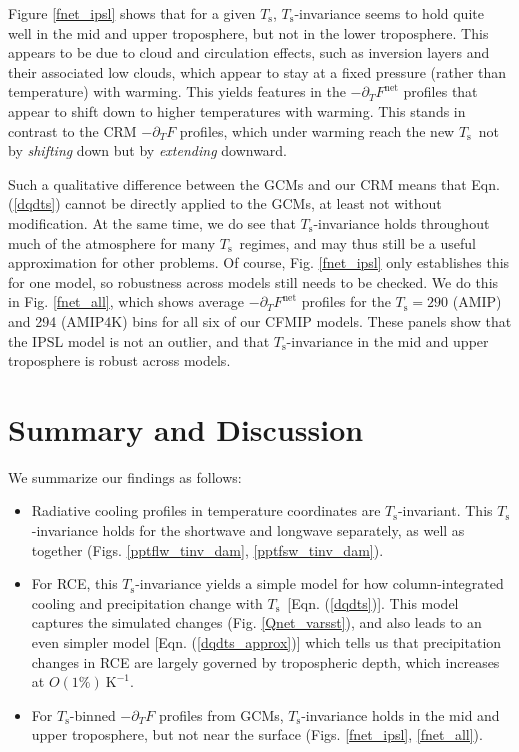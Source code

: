 \documentclass[9pt,twocolumn,twoside,lineno]{pnas-new}
\newcommand{\eqnref}[1]{(\ref{#1})}
\newcommand{\ppt}{\ensuremath{\partial_T}}
\newcommand{\Fnet}{\ensuremath{F^\mathrm{net}}}
\newcommand{\Ts}{\ensuremath{T_\mathrm{s}}}
\newcommand{\Kinverse}{\ensuremath{\mathrm{K^{-1}}}}
\begin{document}
 Figure \ref{fnet_ipsl} shows that for a given \Ts, \Ts-invariance seems to hold quite well in the mid and upper troposphere, but not in the lower troposphere. This appears to be due to cloud and circulation  effects, such as inversion layers and their associated low clouds, which appear to stay at a fixed pressure (rather than temperature) with warming. This yields features in the $-\ppt \Fnet$ profiles that appear to shift down to higher temperatures with  warming. This stands in contrast to the CRM $-\ppt F$ profiles, which under warming reach the new \Ts\ not by \emph{shifting} down but by \emph{extending} downward. 

Such a qualitative difference between the GCMs and our CRM means that Eqn. \eqnref{dqdts} cannot be directly applied to the GCMs, at least not without modification. At the same time, we do see that \Ts-invariance holds throughout much of the atmosphere for many \Ts\ regimes, and may thus still be a useful approximation for other problems. Of course, Fig. \ref{fnet_ipsl} only establishes this for one model, so robustness across models still needs to be checked. We do this in Fig. \ref{fnet_all}, which shows average $-\ppt \Fnet$ profiles for the $\Ts= 290$ (AMIP) and 294 (AMIP4K) bins  for all six of our  CFMIP models. These panels show that the IPSL model is not an outlier, and that \Ts-invariance in the mid and upper troposphere is robust across models.



\section{Summary and Discussion}
We summarize our findings as follows:
	\begin{itemize}
		\item Radiative cooling profiles in temperature coordinates are  \Ts-invariant. This \Ts-invariance holds for the shortwave and longwave separately, as well as together (Figs. \ref{pptflw_tinv_dam}, \ref{pptfsw_tinv_dam}).
		\item For RCE, this \Ts-invariance yields a simple model for how column-integrated cooling and  precipitation change with \Ts\ [Eqn. \eqnref{dqdts}]. This model captures the simulated changes (Fig. \ref{Qnet_varsst}), and also leads to an even simpler model [Eqn. \eqnref{dqdts_approx}] which tells us that precipitation changes in RCE are largely governed by tropospheric depth, which increases at $O(1\%)\ \Kinverse$.
		\item For \Ts-binned $-\ppt F$ profiles from GCMs, \Ts-invariance holds in the mid and upper troposphere, but not near the surface (Figs. \ref{fnet_ipsl}, \ref{fnet_all}).
	\end{itemize}
		
\end{document}
